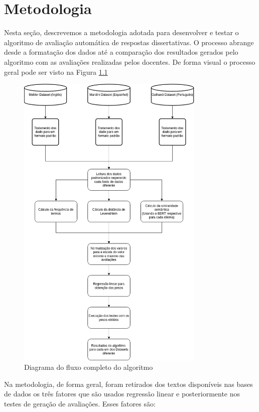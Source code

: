 \chapter{Metodologia}

Nesta seção, descrevemos a metodologia adotada para desenvolver e testar o algoritmo de avaliação automática de respostas dissertativas. O processo abrange desde a formatação dos dados até a comparação dos resultados gerados pelo algoritmo com as avaliações realizadas pelos docentes. De forma visual o processo geral pode ser visto na Figura \ref{figure:29}

\begin{figure}[h!]
\centering
\includegraphics[width=0.8\textwidth]{img/tccFlux.png}
\caption{Diagrama do fluxo completo do algoritmo}\label{figure:29}
\end{figure}

\FloatBarrier

Na metodologia, de forma geral, foram retirados dos textos disponíveis nas bases de dados os três fatores que são usados regressão linear e posteriormente nos testes de geração de avaliações. Esses fatores são:

